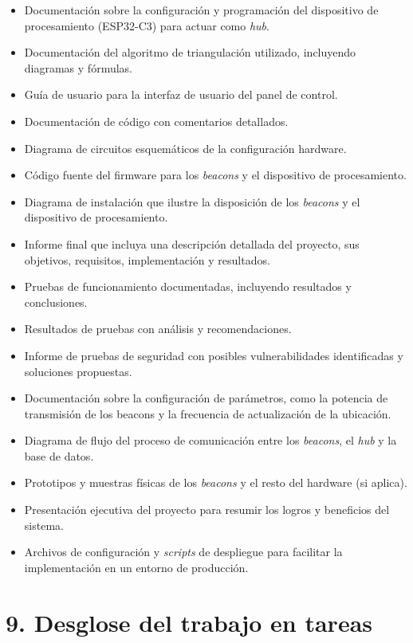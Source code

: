 \documentclass[
11pt, %
]{charter}
\begin{document}
\begin{itemize}
	\item Documentación sobre la configuración y programación del dispositivo de procesamiento (ESP32-C3) para actuar como \textit{hub}.
	\item Documentación del algoritmo de triangulación utilizado, incluyendo diagramas y fórmulas.
	\item Guía de usuario para la interfaz de usuario del panel de control.
	\item Documentación de código con comentarios detallados.
	\item Diagrama de circuitos esquemáticos de la configuración hardware.
	\item Código fuente del firmware para los \textit{beacons} y el dispositivo de procesamiento.
	\item Diagrama de instalación que ilustre la disposición de los \textit{beacons} y el dispositivo de procesamiento.
	\item Informe final que incluya una descripción detallada del proyecto, sus objetivos, requisitos, implementación y resultados.
	\item Pruebas de funcionamiento documentadas, incluyendo resultados y conclusiones.
	\item Resultados de pruebas con análisis y recomendaciones.
	\item Informe de pruebas de seguridad con posibles vulnerabilidades identificadas y soluciones propuestas.
	\item Documentación sobre la configuración de parámetros, como la potencia de transmisión de los beacons y la frecuencia de actualización de la ubicación.
	\item Diagrama de flujo del proceso de comunicación entre los \textit{beacons}, el \textit{hub} y la base de datos.
	\item Prototipos y muestras físicas de los \textit{beacons} y el resto del hardware (si aplica).
	\item Presentación ejecutiva del proyecto para resumir los logros y beneficios del sistema.
	\item Archivos de configuración y \textit{scripts} de despliegue para facilitar la implementación en un entorno de producción.

\end{itemize}

\section{9. Desglose del trabajo en tareas}
\label{sec:wbs}
\end{document}
